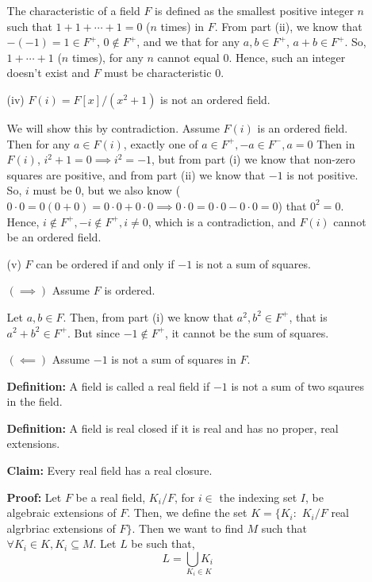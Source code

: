 \documentclass[12pt]{article}
\begin{document}
\begin{solution}
\begin{enumerate}
\begin{enumerate}
            The characteristic of a field $F$ is defined as the smallest positive integer $n$ such that $1+1 +  \cdots + 1 = 0$ ($n$ times) in $F$. From part (ii), we know that $-(-1) = 1 \in F^+$, $0 \notin F^+$, and we that for any $a,b \in F^+$, $a + b \in F^+$. So, $1 + \cdots + 1$ ($n$ times), for any $n$ cannot equal $0$. Hence, such an integer doesn't exist and $F$ must be characteristic $0$. 

            \bbni 

            \item [(iv)] $F(i) = F[x]/(x^2+1)$ is not an ordered field. 
            
            We will show this by contradiction. Assume $F(i)$ is an ordered field. Then for any $a \in F(i)$, exactly one of $a \in F^+, -a \in F^{-}, a = 0$ Then in $F(i)$, $i^2 + 1 = 0 \implies i^2 = -1$, but from part (i) we know that non-zero squares are positive, and from part (ii) we know that $-1$ is not positive. So, $i$ must be $0$, but we also know ($0 \cdot 0 = 0(0 + 0) = 0 \cdot 0  + 0 \cdot 0 \implies 0 \cdot 0 = 0 \cdot 0 - 0 \cdot 0  = 0$) that $0^2 = 0$. Hence, $i \notin F^+, -i \notin F^+, i \neq 0$, which is a contradiction, and $F(i)$ cannot be an ordered field.  

            \bbni 
            
            \item [(v)] $F$ can be ordered if and only if $-1$ is not a sum of squares. 
            
            $(\implies)$ Assume $F$ is ordered. 

            Let $a, b \in F$. 
            Then, from part (i) we know that $a^2, b^2 \in F^+$, that is $a^2 + b^2 \in F^+$. But since $-1 \notin F^+$, it cannot be the sum of squares. 

            \bbni 

            $(\impliedby)$ Assume $-1$ is not a sum of squares in $F$.
            
            \textbf{Definition:} 
                A field is called a real field if $-1$ is not a sum of two sqaures in the field. 
             
            \textbf{Definition:} 
                A field is real closed if it is real and has no proper, real extensions. 
                
            \textbf{Claim:}
                Every real field has a real closure. 

            \textbf{Proof:} Let $F$ be a real field, $K_i/F$, for $i \in$ the indexing set $I$, be algebraic extensions of $F$.
            Then, we define the set $K = \{K_i:$  $K_i/F$ real algrbriac extensions of $F\}$. Then we want to find $M$ such that $\forall K_i \in K, K_i \subseteq M$. Let $L$ be such that, 
            \[L = \underset{K_i \in K}{\bigcup K_i}\]
            

\end{enumerate}
\end{enumerate}
\end{solution}
\end{document}
